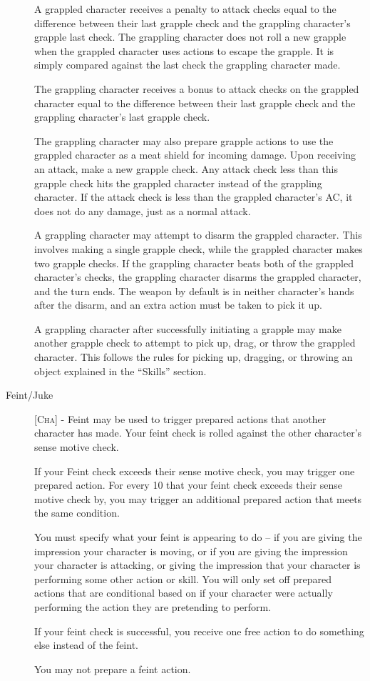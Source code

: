 \begin{description}
A grappled character receives a penalty to attack checks equal to the difference between their last grapple check and the grappling character’s grapple last check. The grappling character does not roll a new grapple when the grappled character uses actions to escape the grapple. It is simply compared against the last check the grappling character made.

The grappling character receives a bonus to attack checks on the grappled character equal to the difference between their last grapple check and the grappling character’s last grapple check.

The grappling character may also prepare grapple actions to use the grappled character as a meat shield for incoming damage. Upon receiving an attack, make a new grapple check. Any attack check less than this grapple check hits the grappled character instead of the grappling character. If the attack check is less than the grappled character's AC, it does not do any damage, just as a normal attack.

A grappling character may attempt to disarm the grappled character. This involves making a single grapple check, while the grappled character makes two grapple checks. If the grappling character beats both of the grappled character's checks, the grappling character disarms the grappled character, and the turn ends. The weapon by default is in neither character's hands after the disarm, and an extra action must be taken to pick it up.

A grappling character after successfully initiating a grapple may make another grapple check to attempt to pick up, drag, or throw the grappled character. This follows the rules for picking up, dragging, or throwing an object explained in the ``Skills'' section.

\item[Feint/Juke] [\textsc{Cha}] - Feint may be used to trigger prepared actions that another character has made. Your feint check is rolled against the other character’s sense motive check.

If your Feint check exceeds their sense motive check, you may trigger one prepared action. For every 10 that your feint check exceeds their sense motive check by, you may trigger an additional prepared action that meets the same condition.

You must specify what your feint is appearing to do -- if you are giving the impression your character is moving, or if you are giving the impression your character is attacking, or giving the impression that your character is performing some other action or skill. You will only set off prepared actions that are conditional based on if your character were actually performing the action they are pretending to perform.

If your feint check is successful, you receive one free action to do something else instead of the feint.

You may not prepare a feint action.
\end{description}